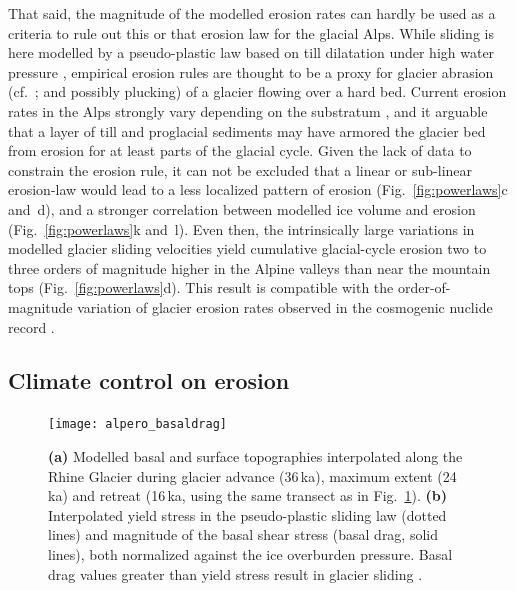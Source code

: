 \documentclass[esurf, manuscript]{copernicus}
\begin{document}
    That said, the magnitude of the modelled erosion rates can hardly be used
    as a criteria to rule out this or that erosion law for the glacial Alps.
    While sliding is here modelled by a pseudo-plastic law based on
    till dilatation under high water pressure \citep{Tulaczyk.etal.2000},
    empirical erosion rules are thought to be a proxy for glacier abrasion
    (cf.~\citealp{Hallet.1979}; and possibly plucking) of a glacier flowing
    over a hard bed. Current erosion rates in the Alps strongly vary depending
    on the substratum \citep{Steinemann.etal.2020, Steinemann.etal.2021}, and
    it arguable that a layer of till and proglacial sediments may have armored
    the glacier bed from erosion for at least parts of the glacial cycle.
    Given the lack of data to constrain the erosion rule, it can not
    be excluded that a linear or sub-linear erosion-law
    \citep[e.g.,][]{Cook.etal.2020} would lead to a less localized pattern of
    erosion (Fig.~\ref{fig:powerlaws}c and~d), and a stronger correlation
    between modelled ice volume and erosion (Fig.~\ref{fig:powerlaws}k and~l).
    Even then, the intrinsically large variations in modelled glacier sliding
    velocities yield cumulative glacial-cycle erosion two to three orders of
    magnitude higher in the Alpine valleys than near the mountain tops
    (Fig.~\ref{fig:powerlaws}d). This result is compatible with the
    order-of-magnitude variation of glacier erosion rates observed in the
    cosmogenic nuclide record \citep{Jansen.etal.2019, Steinemann.etal.2020,
    Steinemann.etal.2021}.


\subsection{Climate control on erosion}

    \begin{figure}
      \centerline{\texttt{[image: alpero\_basaldrag]}}
      \caption{%
        \textbf{(a)} Modelled basal and surface topographies interpolated along
        the Rhine Glacier during glacier advance (36\,ka), maximum extent
        (24\,ka) and retreat (16\,ka, using the same transect as in
        Fig.~\ref{fig:basaldrag}).
        \textbf{(b)} Interpolated yield stress in the pseudo-plastic sliding law
        (dotted lines) and magnitude of the basal shear stress (basal drag,
        solid lines), both normalized against the ice overburden pressure.
        Basal drag values greater than yield stress result in glacier sliding
        \citep[cf.][for model physics]{Seguinot.2014, Seguinot.etal.2016}.}
      \label{fig:basaldrag}
    \end{figure}
\end{document}
